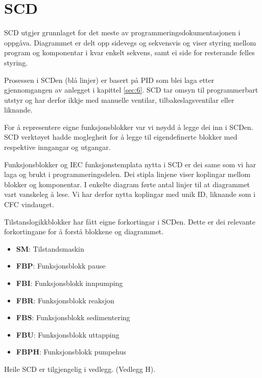 \newpage
\section{SCD}
\thispagestyle{fancy}

\gls{SCD} utgjer grunnlaget for det meste av programmeringsdokumentasjonen i oppgåva.
Diagrammet er delt opp sidevegs og sekvensvis og viser styring mellom program og komponentar i kvar enkelt sekvens,
samt ei side for resterande felles styring.

Prosessen i \gls{SCD}en (blå linjer) er basert på \gls{PID} som blei laga etter gjennomgangen av anlegget i kapittel \ref{sec:6}.
\gls{SCD} tar omsyn til programmerbart utstyr og har derfor ikkje med manuelle ventilar, tilbakeslagsventilar eller liknande.

For å representere eigne funksjonsblokker var vi nøydd å legge dei inn i \gls{SCD}en.
\gls{SCD} verktøyet hadde moglegheit for å legge til eigendefinerte blokker med respektive inngangar og utgangar.

Funksjonsblokker og \gls{IEC} funksjonstemplata nytta i \gls{SCD} er dei same som vi har laga og brukt i programmeringsdelen. 
Dei stipla linjene viser koplingar mellom blokker og komponentar. \newline
I enkelte diagram førte antal linjer til at diagrammet vart vanskeleg å lese. 
Vi har derfor nytta koplingar med unik ID, liknande som i CFC vindauget.

Tilstanslogikkblokker har fått eigne forkortingar i \gls{SCD}en.
Dette er dei relevante forkortingane for å forstå blokkene og diagrammet.

\begin{itemize}
    \item \textbf{SM}:   Tilstandsmaskin
    \item \textbf{FBP}:  Funksjonsblokk pause
    \item \textbf{FBI}:  Funksjonsblokk innpumping
    \item \textbf{FBR}:  Funksjonsblokk reaksjon
    \item \textbf{FBS}:  Funksjonsblokk sedimentering
    \item \textbf{FBU}:  Funksjonsblokk uttapping
    \item \textbf{FBPH}: Funksjonsblokk pumpehus
\end{itemize}

Heile \gls{SCD} er tilgjengelig i vedlegg. (Vedlegg H). \newline
\newpage

